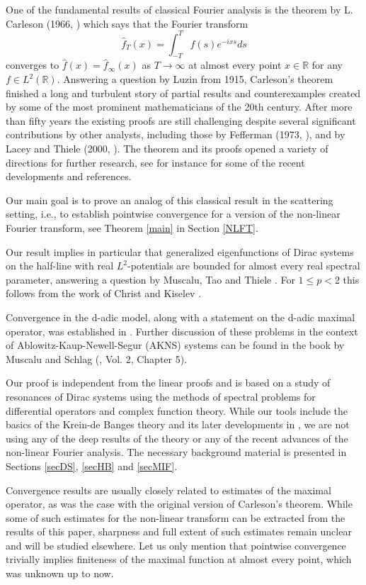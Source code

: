\documentclass[11pt,twoside,reqno]{amsart}
\def\to{\rightarrow}
\def\R{{\mathbb R}}
\theoremstyle{plain}
\numberwithin{equation}{section}
\begin{document}
One of the fundamental results of classical Fourier analysis is the theorem by L. Carleson (1966, \cite{C}) which says that
the Fourier transform
$$\hat f_T(x)=\int_{-T}^T f(s)e^{-ixs}ds$$
converges to $\hat f(x)=\hat f_\infty(x)$ as $T\to\infty$ at almost every point $x\in\R$ for any $f\in L^2(\R)$.
Answering a question by Luzin from 1915, Carleson's theorem
finished a long and turbulent story of partial results and counterexamples created by some of the most prominent mathematicians of the 20th century.
After more than fifty years the existing proofs are still challenging despite several significant contributions by other analysts, including those
by Fefferman (1973, \cite{F}), and by Lacey and  Thiele (2000, \cite{LT}). The theorem and its proofs opened a variety of directions
for further research, see for instance \cite{D, OSTTW} for some of the recent developments and references.



Our main goal is to prove an analog of this classical result in the scattering setting, i.e., to establish pointwise convergence for a version of the non-linear Fourier transform, see Theorem \ref{main} in Section \ref{NLFT}.

Our result implies in particular that generalized eigenfunctions of Dirac systems on the half-line with real $L^2$-potentials are bounded for almost every real spectral parameter, answering a question by Muscalu, Tao and Thiele \cite{MTT1}.
For $1\leq p<2$ this follows from the work of Christ and Kiselev \cite{CK, CK1}.

Convergence in the d-adic model, along with a statement on the d-adic maximal operator, was established
in \cite{MTT}. Further discussion of these problems in the context of Ablowitz-Kaup-Newell-Segur (AKNS) systems can be found
in the book by Muscalu and Schlag (\cite{MS}, Vol. 2, Chapter 5).

Our proof is independent from the linear proofs and is based on a study of resonances of Dirac systems using the methods of spectral
problems for differential operators and complex function theory. While our tools include the basics of the Krein-de Banges theory and its later developments in \cite{MIF1, MIF2, MP},
we are not using any of the deep results of the theory or any of the recent advances of the non-linear Fourier analysis. The necessary background material is  presented in Sections
\ref{secDS}, \ref{secHB} and \ref{secMIF}.

Convergence results are usually closely related to estimates of the maximal operator, as was the case with the original version of Carleson's theorem. While some of such estimates for the non-linear transform can be extracted from the results
of this paper,  sharpness and full extent of such estimates remain unclear and will be studied elsewhere. Let us only mention
that pointwise convergence trivially implies finiteness of the maximal function at almost every point, which was unknown up to now.
\end{document}
